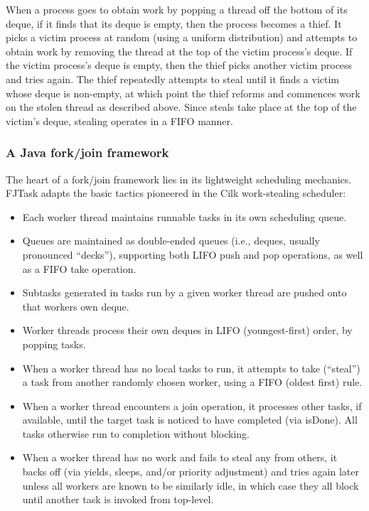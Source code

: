 When a process goes to obtain work by popping a thread off the bottom
of its deque, if it finds that its deque is empty, then the process
becomes a thief. It picks a victim process at random (using a uniform
distribution) and attempts to obtain work by removing the thread at
the top of the victim process's deque.  If the victim process's deque
is empty, then the thief picks another victim process and tries
again. The thief repeatedly attempts to steal until it finds a victim
whose deque is non-empty, at which point the thief reforms and
commences work on the stolen thread as described above. Since steals
take place at the top of the victim's deque, stealing operates in a
FIFO manner.

\subsubsection{A Java fork/join framework \cite{Lea2000}}

The heart of a fork/join framework lies in its lightweight scheduling
mechanics. FJTask adapts the basic tactics pioneered in the Cilk
work-stealing scheduler:

\begin{itemize}
\item Each worker thread maintains runnable tasks in its own
  scheduling queue.
\item Queues are maintained as double-ended queues (i.e., deques,
  usually pronounced ``decks''), supporting both LIFO push and pop
  operations, as well as a FIFO take operation.
\item Subtasks generated in tasks run by a given worker thread are
  pushed onto that workers own deque.
\item Worker threads process their own deques in LIFO (youngest-first)
  order, by popping tasks.
\item When a worker thread has no local tasks to run, it attempts to
  take (``steal'') a task from another randomly chosen worker, using a
  FIFO (oldest first) rule.
\item When a worker thread encounters a join operation, it processes
  other tasks, if available, until the target task is noticed to have
  completed (via isDone). All tasks otherwise run to completion
  without blocking.
\item When a worker thread has no work and fails to steal any from
  others, it backs off (via yields, sleeps, and/or priority
  adjustment) and tries again later unless all workers are known to be
  similarly idle, in which case they all block until another task is
  invoked from top-level.
\end{itemize}

